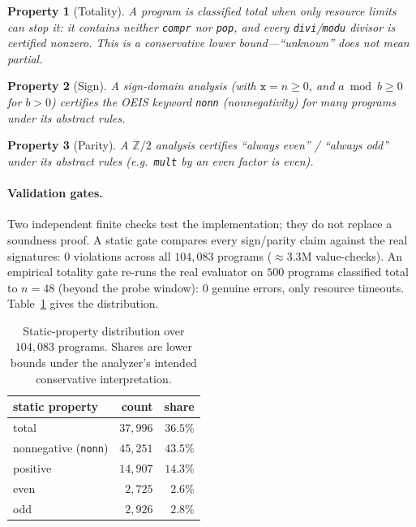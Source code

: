 \documentclass[11pt]{article}
\newcommand{\code}[1]{\texttt{#1}}
\newtheorem{property}{Property}
\begin{document}
\begin{property}[Totality]
A program is \emph{classified total} when only resource limits can stop it: it contains
neither \code{compr} nor \code{pop}, and every \code{divi}/\code{modu} divisor is certified
nonzero. This is a conservative lower bound---``unknown'' does not mean partial.
\end{property}
\begin{property}[Sign]
A sign-domain analysis (with $\code{x}=n\ge 0$, and $a\bmod b\ge 0$ for $b>0$) certifies
the OEIS keyword \code{nonn} (nonnegativity) for many programs under its abstract rules.
\end{property}
\begin{property}[Parity]
A $\mathbb{Z}/2$ analysis certifies ``always even'' / ``always odd'' under its abstract
rules (e.g.\ \code{mult} by an even factor is even).
\end{property}

\paragraph{Validation gates.} Two independent finite checks test the implementation; they
do not replace a soundness proof. A static
gate compares every sign/parity claim against the real signatures: $0$ violations across
all $104{,}083$ programs ($\approx 3.3$M value-checks). An empirical totality gate re-runs
the real evaluator on $500$ programs classified total to $n=48$ (beyond the probe window):
$0$ genuine errors, only resource timeouts. Table~\ref{tab:props} gives the distribution.

\begin{table}[t]
\centering
\begin{tabular}{@{}lrr@{}}
\toprule
static property & count & share \\
\midrule
total          & $37{,}996$ & $36.5\%$ \\
nonnegative (\code{nonn}) & $45{,}251$ & $43.5\%$ \\
positive       & $14{,}907$ & $14.3\%$ \\
even           & $2{,}725$  & $2.6\%$ \\
odd            & $2{,}926$  & $2.8\%$ \\
\bottomrule
\end{tabular}
\caption{Static-property distribution over $104{,}083$ programs. Shares are lower bounds
under the analyzer's intended conservative interpretation.}
\label{tab:props}
\end{table}
\end{document}
